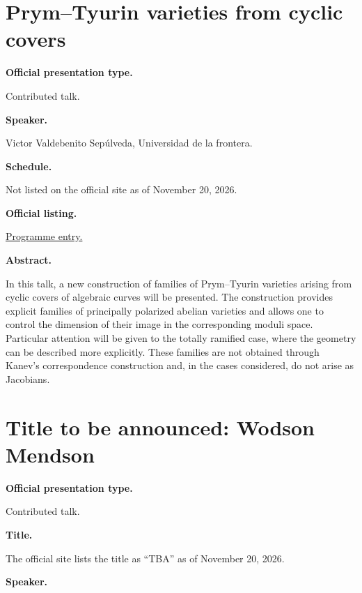 \section{Prym–Tyurin varieties from cyclic
covers}
\label{section-prymtyurin-varieties-from}

\medskip\noindent
{\bf Official presentation type.}

Contributed talk.

\medskip\noindent
{\bf Speaker.}

Victor Valdebenito Sepúlveda, Universidad de
la frontera.

\medskip\noindent
{\bf Schedule.}

Not listed on the official site as of
November 20, 2026.

\medskip\noindent
{\bf Official listing.}

\href{%
https://sites.google.com/view/%
geoalgcompluff/legal/%
legal-2027-resumos#h.dant8g3oe5ea%
}{Programme entry.}

\medskip\noindent
{\bf Abstract.}

In this talk, a new construction of families
of Prym–Tyurin varieties arising from cyclic
covers of algebraic curves will be presented.
The construction provides explicit families
of principally polarized abelian varieties
and allows one to control the dimension of
their image in the corresponding moduli
space. Particular attention will be given to
the totally ramified case, where the geometry
can be described more explicitly. These
families are not obtained through Kanev’s
correspondence construction and, in the cases
considered, do not arise as Jacobians.

\section{Title to be announced: Wodson
Mendson}
\label{section-tba-mendson}

\medskip\noindent
{\bf Official presentation type.}

Contributed talk.

\medskip\noindent
{\bf Title.}

The official site lists the title as
``TBA'' as of November 20, 2026.

\medskip\noindent
{\bf Speaker.}

